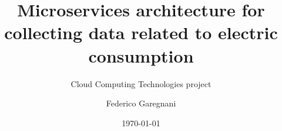 \documentclass{beamer}
\title[Cloud Comp. Technologies project]{Microservices architecture for collecting data related to electric consumption}
\subtitle{Cloud Computing Technologies project}
\author{Federico Garegnani}
\institute[UniMI]{Università degli Studi di Milano}
\date{\today}
\begin{document}
	\frame{\titlepage}
	
	
	
	
\end{document}
